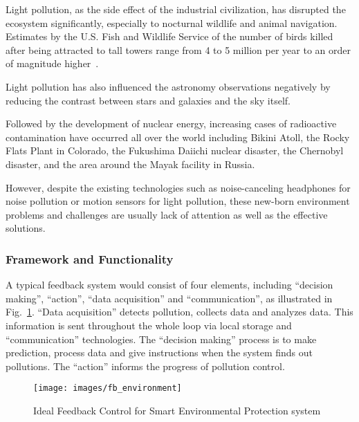 \documentclass[letterpaper, twocolumn, 10pt, conference]{IEEEtran}
\begin{document}
Light pollution, as the side effect of the industrial civilization, has disrupted the ecosystem significantly, especially to nocturnal wildlife and animal navigation. Estimates by the U.S. Fish and Wildlife Service of the number of birds killed after being attracted to tall towers range from 4 to 5 million per year to an order of magnitude higher~\cite{Malakoff2001bird}.
 
Light pollution has also influenced the astronomy observations negatively by reducing the contrast between stars and galaxies and the sky itself.
 
Followed by the development of nuclear energy, increasing cases of radioactive contamination have occurred all over the world including Bikini Atoll, the Rocky Flats Plant in Colorado, the Fukushima Daiichi nuclear disaster, the Chernobyl disaster, and the area around the Mayak facility in Russia.
 
However, despite the existing technologies such as noise-canceling headphones for noise pollution or motion sensors for light pollution, these new-born environment problems and challenges are usually lack of attention as well as the effective solutions.

\subsubsection{Framework and Functionality}
\label{sssec:zzj:smart_environment:framework}

A typical feedback system would consist of four elements, including \enquote{decision making}, \enquote{action}, \enquote{data acquisition} and \enquote{communication}, as illustrated in Fig.~\ref{fig:zzj:smart_environment_feedback}. \enquote{Data acquisition} detects pollution, collects data and analyzes data. This information is sent throughout the whole loop via local storage and \enquote{communication} technologies. The \enquote{decision making} process is to make prediction, process data and give instructions when the system finds out pollutions. The \enquote{action} informs the progress of pollution control. 

\begin{figure}[h!]
        \centering
        \texttt{[image: images/fb\_environment]}
        \caption{Ideal Feedback Control for Smart Environmental Protection system}
        \label{fig:zzj:smart_environment_feedback}
\end{figure}


\end{document}
